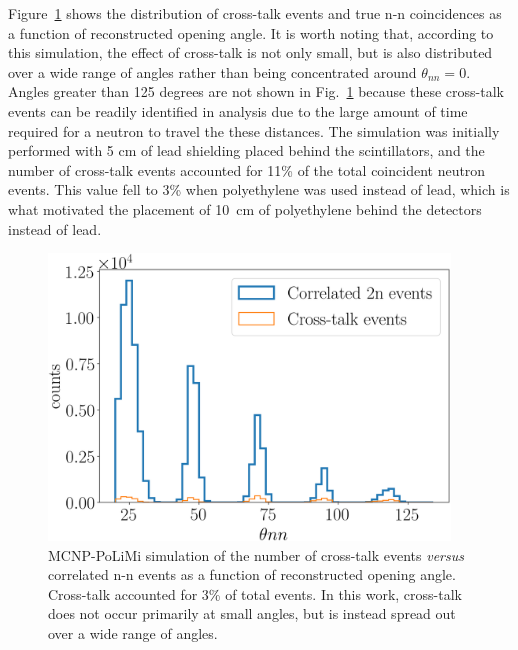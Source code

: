 Figure~\ref{fig:CrosstalkVScoincidence} shows the distribution of cross-talk events and true n-n coincidences as a function of reconstructed opening angle.
It is worth noting that, according to this simulation, the effect of cross-talk is not only small, but is also distributed over a wide range of angles rather than being concentrated around $\theta_{nn}=0$.
Angles greater than 125 degrees are not shown in Fig.~\ref{fig:CrosstalkVScoincidence} because these cross-talk events can be readily identified in analysis due to the large amount of time required for a neutron to travel the these distances.
The simulation was initially performed with 5 cm of lead shielding placed behind the scintillators, and the number of cross-talk events accounted for 11\% of the total coincident neutron events.
This value fell to 3\% when polyethylene was used instead of lead, which is what motivated the placement of 10~cm of polyethylene behind the detectors instead of lead.
\begin{figure}
    \centering
    \includegraphics[width = 0.95\textwidth]{Content/Errors/CrosstalkVScoincidence.png}
    \caption{
    MCNP-PoLiMi simulation of the number of cross-talk events \emph{versus} correlated n-n events as a function of reconstructed opening angle.
    Cross-talk accounted for 3\% of total events.
    In this work, cross-talk does not occur primarily at small angles, but is instead spread out over a wide range of angles.
    }
    \label{fig:CrosstalkVScoincidence}
\end{figure}

